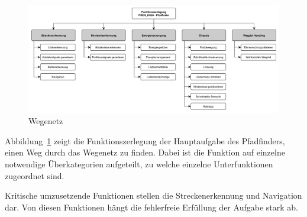 \documentclass[../main.tex]{subfiles}
\begin{document}
\begin{figure}[h!]
    \centering
    \includegraphics[width=1\textwidth]{./resources/Funktionszerlegung}
    \caption{Wegenetz}\label{fig:Funktionszerlegung}
\end{figure}

Abbildung~\ref{fig:Funktionszerlegung} zeigt die Funktionszerlegung der
Hauptaufgabe des Pfadfinders, einen Weg durch das Wegenetz zu finden. Dabei ist
die Funktion auf einzelne notwendige Überkategorien aufgeteilt, zu welche
einzelne Unterfunktionen zugeordnet sind.

Kritische umzusetzende Funktionen stellen die Streckenerkennung und Navigation
dar. Von diesen Funktionen hängt die fehlerfreie Erfüllung der Aufgabe stark
ab.
\end{document}
